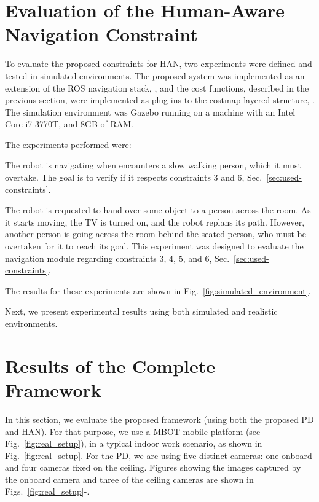 \documentclass[5p,time]{elsarticle}
\begin{document}
\section{Evaluation of the Human-Aware Navigation Constraint}\label{sec:Simulation-Experiments}
To evaluate the proposed constraints for HAN, two experiments were defined and tested in simulated environments. The proposed system was implemented as an extension of the ROS navigation stack, \cite{article:marder:2010}, and the cost functions, described in the previous section, were implemented as plug-ins to the costmap layered structure, \cite{article:lu:2014}. The simulation environment was Gazebo running on a machine with an Intel Core i7-3770T, and 8GB of RAM.

The experiments performed were:
\begin{list}{\bf Experiment :\ }{\setlength{\labelwidth}{0.5cm}\setlength{\labelsep}{0cm}\setlength{\leftmargin}{0.5cm}}
	\item The robot is navigating when encounters a slow walking person, which it must overtake. The goal is to verify if it respects constraints 3 and 6, Sec.~\ref{sec:used-constraints}.
	\item The robot is requested to hand over some object to a person across the room. As it starts moving, the TV is turned on, and the robot replans its path. However, another person is going across the room behind the seated person, who must be overtaken for it to reach its goal. This experiment was designed to evaluate the navigation module regarding constraints 3, 4, 5, and 6, Sec.~\ref{sec:used-constraints}.
\end{list}
The results for these experiments are shown in Fig.~\ref{fig:simulated_environment}.

Next, we present experimental results using both simulated and realistic environments.


\section{Results of the Complete Framework}
\label{sec:results-simul-envir}

In this section, we evaluate the proposed framework (using both the proposed PD and HAN). For that purpose, we use a MBOT mobile platform \cite{72} (see Fig.~\ref{fig:real_setup}), in a typical indoor work scenario, as shown in Fig.~\ref{fig:real_setup}. For the PD, we are using five distinct cameras: one onboard and four cameras fixed on the ceiling. Figures showing the images captured by the onboard camera and three of the ceiling cameras are shown in Figs.~\ref{fig:real_setup}-.
\end{document}
